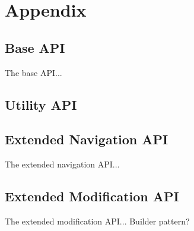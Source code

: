 \documentclass[smallheadings,headsepline,pointlessnumbers,11pt,a4paper]{scrbook}
\let\origdoublepage\cleardoublepage
\renewcommand{\cleardoublepage}{%
  \clearpage{\pagestyle{empty}\origdoublepage}}
\begin{document}
\cleardoublepage

\tableofcontents

\mainmatter




\renewcommand{\listfigurename}{List of Figures}
\listoffigures
\cleardoublepage

%

\renewcommand{\thesection}{A\arabic{section}}
\setcounter{section}{0}  %
\renewcommand{\thechapter}{A}
\chapter{Appendix}

\begin{appendix}
\section{Base API}
\label{app:baseapi}

The base API...
%

\section{Utility API}
\label{app:utilapi}

\section{Extended Navigation API}
\label{app:navapi}

The extended navigation API...

\section{Extended Modification API}
\label{app:modapi}

The extended modification API...
Builder pattern?


\end{appendix}


\end{document}
